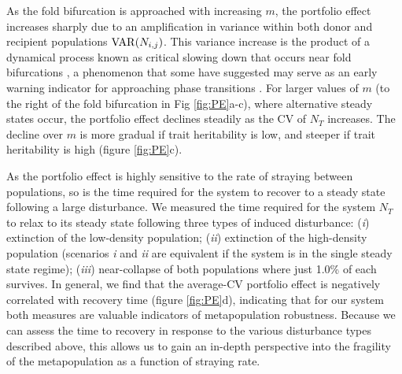 \documentclass[twocolumn,preprintnumbers,amsmath,amssymb,superscriptaddress]{revtex4}
\begin{document}

As the fold bifurcation is approached with increasing $m$, the portfolio effect increases sharply due to an amplification in variance within both donor and recipient populations ${\rm VAR}(N_{i,j})$.
This variance increase is the product of a dynamical process known as critical slowing down that occurs near fold bifurcations \cite{Scheffer:2009gg}, a phenomenon that some have suggested may serve as an early warning indicator for approaching phase transitions \cite{Scheffer:2009gg,Lade:2012eu,Anonymous:2013br,Dakos:2014br}.
For larger values of $m$ (to the right of the fold bifurcation in Fig \ref{fig:PE}a-c), where alternative steady states occur, the portfolio effect declines steadily as the CV of $N_T$ increases.
The decline over $m$ is more gradual if trait heritability is low, and steeper if trait heritability is high (figure \ref{fig:PE}c).



As the portfolio effect is highly sensitive to the rate of straying between populations, so is the time required for the system to recover to a steady state following a large disturbance.
We measured the time required for the system $N_T$ to relax to its steady state following three types of induced disturbance: (\emph{i}) extinction of the low-density population; (\emph{ii}) extinction of the high-density population (scenarios \emph{i} and \emph{ii} are equivalent if the system is in the single steady state regime); (\emph{iii}) near-collapse of both populations where just 1.0\% of each survives.
In general, we find that the average-CV portfolio effect is negatively correlated with recovery time (figure \ref{fig:PE}d), indicating that for our system both measures are valuable indicators of metapopulation robustness.
Because we can assess the time to recovery in response to the various disturbance types described above, this allows us to gain an in-depth perspective into the fragility of the metapopulation as a function of straying rate.
\end{document}
